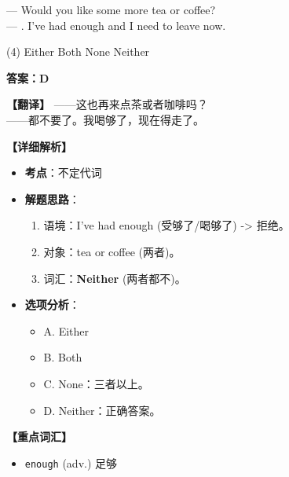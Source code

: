 \documentclass[11pt, a4paper]{article}
\newcommand{\analysis}[4]{
    \begin{solutionbox}
        \textbf{答案：#1}
        
        \textbf{【翻译】} #2
        
        \textbf{【详细解析】}
        #3
        
        \textbf{【重点词汇】}
        #4
    \end{solutionbox}
}
\newcommand{\blank}{\underline{\hspace{1.5cm}}}
\begin{document}
\begin{questions}
    \item — Would you like some more tea or coffee? \\
    — \blank. I’ve had enough and I need to leave now.
    \begin{tasks}(4)
        \task Either \task Both \task None \task Neither
    \end{tasks}
    \analysis{D}{——这也再来点茶或者咖啡吗？\\——都不要了。我喝够了，现在得走了。}{
        \begin{itemize}
            \item \textbf{考点}：不定代词
            \item \textbf{解题思路}：
                \begin{enumerate}
                    \item 语境：I've had enough (受够了/喝够了) -> 拒绝。
                    \item 对象：tea or coffee (两者)。
                    \item 词汇：\textbf{Neither} (两者都不)。
                \end{enumerate}
            \item \textbf{选项分析}：
                \begin{itemize}
                    \item A. Either
                    \item B. Both
                    \item C. None：三者以上。
                    \item D. Neither：正确答案。
                \end{itemize}
        \end{itemize}
    }{
        \begin{itemize}
            \item \texttt{enough} (adv.) 足够
        \end{itemize}
    }


\end{questions}
\end{document}
